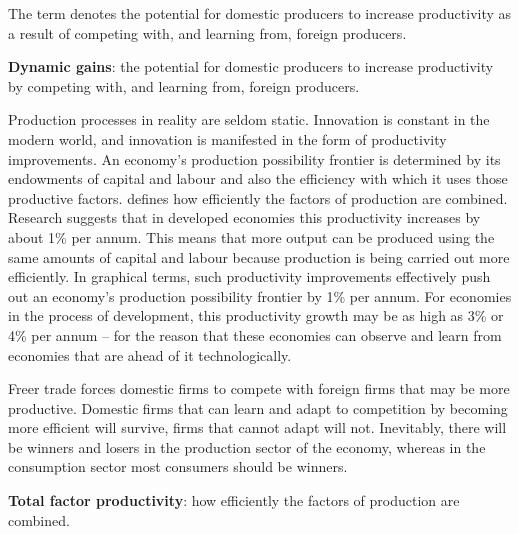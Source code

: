 The term  denotes the potential for domestic producers
to increase productivity as a result of competing with, and learning from,
foreign producers.

\begin{DefBox}
	\textbf{Dynamic gains}: the potential for domestic producers to increase productivity by competing with, and learning from, foreign producers.
\end{DefBox}

Production processes in reality are seldom static. Innovation is constant in
the modern world, and innovation is manifested in the form of productivity
improvements. An economy's production possibility frontier is determined by
its endowments of capital and labour and also the efficiency with which it
uses those productive factors.  defines
how efficiently the factors of production are combined. Research suggests
that in developed economies this productivity increases by about 1\% per
annum. This means that more output can be produced using the same amounts of
capital and labour because production is being carried out more efficiently.
In graphical terms, such productivity improvements effectively push out an
economy's production possibility frontier by 1\% per annum. For economies
in the process of development, this productivity growth may be as high as 
3\% or 4\% per annum -- for the reason that these economies can observe
and learn from economies that are ahead of it technologically.

Freer trade forces domestic firms to compete with foreign firms that may be
more productive. Domestic firms that can learn and adapt to competition by
becoming more efficient will survive, firms that cannot adapt will not.
Inevitably, there will be winners and losers in the production sector of the
economy, whereas in the consumption sector most consumers should be winners.

\begin{DefBox}
	\textbf{Total factor productivity}: how efficiently the factors of production are combined.
\end{DefBox}